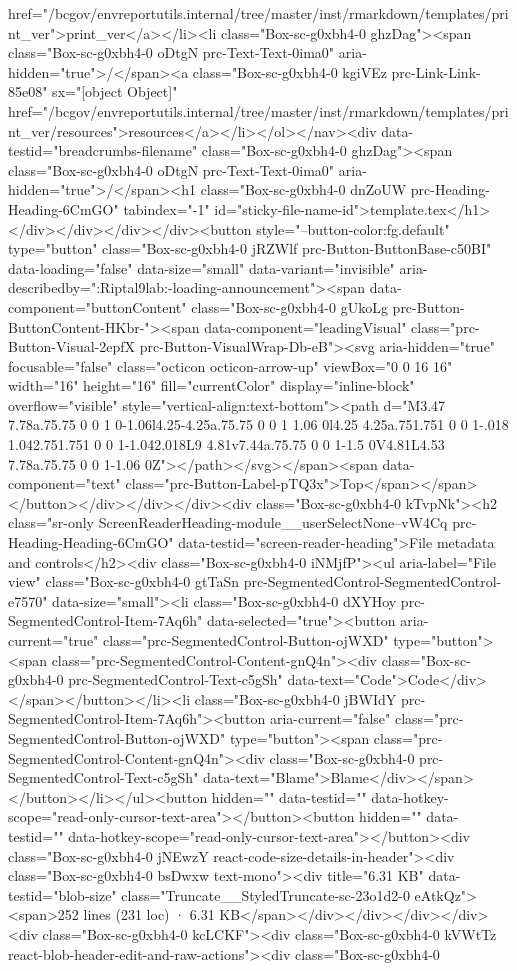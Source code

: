 {{{{{{{{{{{{{{{{{{{{{{{{{{{{{{{href="/bcgov/envreportutils.internal/tree/master/inst/rmarkdown/templates/print_ver">print_ver</a></li><li class="Box-sc-g0xbh4-0 ghzDag"><span class="Box-sc-g0xbh4-0 oDtgN prc-Text-Text-0ima0" aria-hidden="true">/</span><a class="Box-sc-g0xbh4-0 kgiVEz prc-Link-Link-85e08" sx="[object Object]" href="/bcgov/envreportutils.internal/tree/master/inst/rmarkdown/templates/print_ver/resources">resources</a></li></ol></nav><div data-testid="breadcrumbs-filename" class="Box-sc-g0xbh4-0 ghzDag"><span class="Box-sc-g0xbh4-0 oDtgN prc-Text-Text-0ima0" aria-hidden="true">/</span><h1 class="Box-sc-g0xbh4-0 dnZoUW prc-Heading-Heading-6CmGO" tabindex="-1" id="sticky-file-name-id">template.tex</h1></div></div></div></div><button style="--button-color:fg.default" type="button" class="Box-sc-g0xbh4-0 jRZWlf prc-Button-ButtonBase-c50BI" data-loading="false" data-size="small" data-variant="invisible" aria-describedby=":Riptal9lab:-loading-announcement"><span data-component="buttonContent" class="Box-sc-g0xbh4-0 gUkoLg prc-Button-ButtonContent-HKbr-"><span data-component="leadingVisual" class="prc-Button-Visual-2epfX prc-Button-VisualWrap-Db-eB"><svg aria-hidden="true" focusable="false" class="octicon octicon-arrow-up" viewBox="0 0 16 16" width="16" height="16" fill="currentColor" display="inline-block" overflow="visible" style="vertical-align:text-bottom"><path d="M3.47 7.78a.75.75 0 0 1 0-1.06l4.25-4.25a.75.75 0 0 1 1.06 0l4.25 4.25a.751.751 0 0 1-.018 1.042.751.751 0 0 1-1.042.018L9 4.81v7.44a.75.75 0 0 1-1.5 0V4.81L4.53 7.78a.75.75 0 0 1-1.06 0Z"></path></svg></span><span data-component="text" class="prc-Button-Label-pTQ3x">Top</span></span></button></div></div></div><div class="Box-sc-g0xbh4-0 kTvpNk"><h2 class="sr-only ScreenReaderHeading-module__userSelectNone--vW4Cq prc-Heading-Heading-6CmGO" data-testid="screen-reader-heading">File metadata and controls</h2><div class="Box-sc-g0xbh4-0 iNMjfP"><ul aria-label="File view" class="Box-sc-g0xbh4-0 gtTaSn prc-SegmentedControl-SegmentedControl-e7570" data-size="small"><li class="Box-sc-g0xbh4-0 dXYHoy prc-SegmentedControl-Item-7Aq6h" data-selected="true"><button aria-current="true" class="prc-SegmentedControl-Button-ojWXD" type="button"><span class="prc-SegmentedControl-Content-gnQ4n"><div class="Box-sc-g0xbh4-0 prc-SegmentedControl-Text-c5gSh" data-text="Code">Code</div></span></button></li><li class="Box-sc-g0xbh4-0 jBWIdY prc-SegmentedControl-Item-7Aq6h"><button aria-current="false" class="prc-SegmentedControl-Button-ojWXD" type="button"><span class="prc-SegmentedControl-Content-gnQ4n"><div class="Box-sc-g0xbh4-0 prc-SegmentedControl-Text-c5gSh" data-text="Blame">Blame</div></span></button></li></ul><button hidden="" data-testid="" data-hotkey-scope="read-only-cursor-text-area"></button><button hidden="" data-testid="" data-hotkey-scope="read-only-cursor-text-area"></button><div class="Box-sc-g0xbh4-0 jNEwzY react-code-size-details-in-header"><div class="Box-sc-g0xbh4-0 bsDwxw text-mono"><div title="6.31 KB" data-testid="blob-size" class="Truncate__StyledTruncate-sc-23o1d2-0 eAtkQz"><span>252 lines (231 loc) · 6.31 KB</span></div></div></div></div><div class="Box-sc-g0xbh4-0 kcLCKF"><div class="Box-sc-g0xbh4-0 kVWtTz react-blob-header-edit-and-raw-actions"><div class="Box-sc-g0xbh4-0 }}}}}}}}}}}}}}}}}}}}}}}}}}}}}}}
